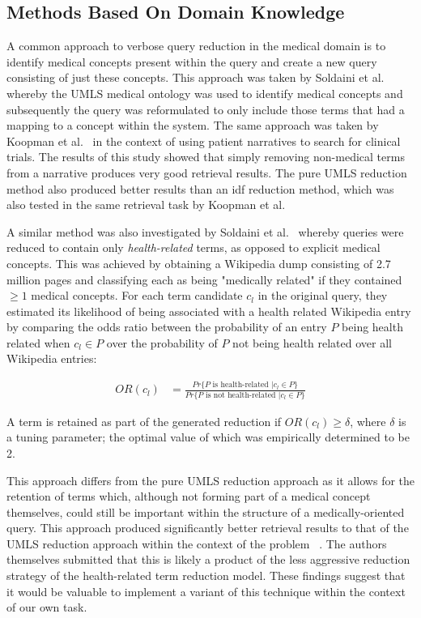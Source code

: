 \documentclass[a4paper]{report}
\begin{document}
\subsection{Methods Based On Domain Knowledge}

A common approach to verbose query reduction in the medical domain is to identify medical concepts present within the query and create a new query consisting of just these concepts. This approach was taken by Soldaini et al.~\citep{Soldaini2015RetrievingML} whereby the UMLS medical ontology was used to identify medical concepts and subsequently the query was reformulated to only include those terms that had a mapping to a concept within the system. The same approach was taken by Koopman et al.~\citep{koopman2017generating} in the context of using patient narratives to search for clinical trials. The results of this study showed that simply removing non-medical terms from a narrative produces very good retrieval results. The pure UMLS reduction method also produced better results than an idf reduction method, which was also tested in the same retrieval task by Koopman et al.
  
A similar method was also investigated by Soldaini et al.~\cite{Soldaini2015RetrievingML} whereby queries were reduced to contain only \textit{health-related} terms, as opposed to explicit medical concepts. This was achieved by obtaining a Wikipedia dump consisting of 2.7 million pages and classifying each as being "medically related" if they contained $\geq 1$ medical concepts. For each term candidate $c_l$ in the original query, they estimated its likelihood of being associated with a health related Wikipedia entry by comparing the odds ratio between the probability of an entry $P$ being health related when $c_l \in P$ over the probability of $P$ not being health related over all Wikipedia entries: 

\begin{equation}
\label{hrterms-lit}
\begin{split}
OR(c_l) &= \frac{Pr\{ P \text{ is health-related } | c_l \in P\}}{Pr\{ P \text{ is not health-related } | c_l \in P\}}
\end{split}
\end{equation}

A term is retained as part of the generated reduction if $OR(c_l) \geq \delta$, where $\delta$ is a tuning parameter; the optimal value of which was empirically determined to be 2.

This approach differs from the pure UMLS reduction approach as it allows for the retention of terms which, although not forming part of a medical concept themselves, could still be important within the structure of a medically-oriented query. This approach produced significantly better retrieval results to that of the UMLS reduction approach within the context of the problem ~\citep{Soldaini2015RetrievingML}. The authors themselves submitted that this is likely a product of the less aggressive reduction strategy of the health-related term reduction model. These findings suggest that it would be valuable to implement a variant of this technique within the context of our own task.
  
\end{document}
